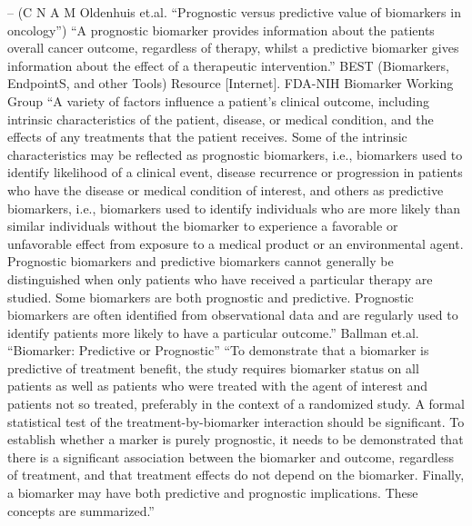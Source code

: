 \documentclass{article}%
\begin{document}
%
– (C N A M Oldenhuis et.al. “Prognostic versus predictive value of biomarkers in oncology”)%
\newline%
\newline%
%
“A prognostic biomarker provides information about the patients overall cancer outcome, regardless of therapy, whilst a predictive biomarker gives information about the effect of a therapeutic intervention.” %
\newline%
\newline%
%
BEST (Biomarkers, EndpointS, and other Tools) Resource {[}Internet{]}. FDA{-}NIH Biomarker Working Group%
\newline%
\newline%
%
“A variety of factors influence a patient’s clinical outcome, including intrinsic characteristics of the patient, disease, or medical condition, and the effects of any treatments that the patient receives. Some of the intrinsic characteristics may be reflected as prognostic biomarkers, i.e., biomarkers used to identify likelihood of a clinical event, disease recurrence or progression in patients who have the disease or medical condition of interest, and others as predictive biomarkers, i.e., biomarkers used to identify individuals who are more likely than similar individuals without the biomarker to experience a favorable or unfavorable effect from exposure to a medical product or an environmental agent. Prognostic biomarkers and predictive biomarkers cannot generally be distinguished when only patients who have received a particular therapy are studied. Some biomarkers are both prognostic and predictive. Prognostic biomarkers are often identified from observational data and are regularly used to identify patients more likely to have a particular outcome.”%
\newline%
\newline%
%
Ballman et.al. “Biomarker: Predictive or Prognostic”%
\newline%
\newline%
%
“To demonstrate that a biomarker is predictive of treatment benefit, the study requires biomarker status on all patients as well as patients who were treated with the agent of interest and patients not so treated, preferably in the context of a randomized study. A formal statistical test of the treatment{-}by{-}biomarker interaction should be significant. To establish whether a marker is purely prognostic, it needs to be demonstrated that there is a significant association between the biomarker and outcome, regardless of treatment, and that treatment effects do not depend on the biomarker. Finally, a biomarker may have both predictive and prognostic implications. These concepts are summarized.”%
\end{document}
